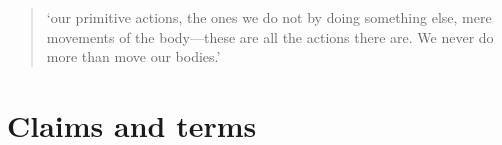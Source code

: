 \documentclass[12pt,a4paper]{extarticle}
\begin{document}
\setlength\footnotesep{1em}


\maketitle


\begin{quote}
`our primitive actions, the ones we do not by doing something else, mere movements of the  body---these are all the actions there are.
We never do more than move our bodies.'
\citep[p.\ 59]{Davidson:1971fz}
\end{quote}

\section{Claims and terms}
\end{document}
